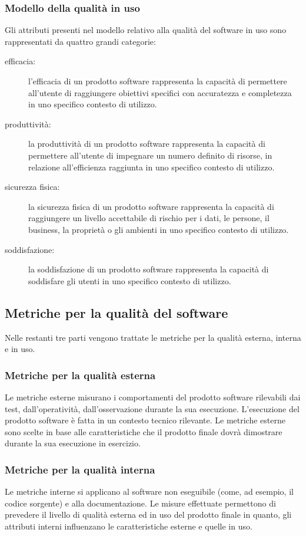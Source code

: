 \documentclass[../PianoDiQualifica.tex]{subfiles}
\begin{document}
\begin{appendices}
		\subsubsection{Modello della qualità in uso}
		Gli attributi presenti nel modello relativo alla qualità del software in uso sono rappresentati da quattro grandi categorie:
		\begin{description}
			\item[efficacia:] l'efficacia di un prodotto software rappresenta la capacità di permettere all'utente di raggiungere obiettivi specifici con accuratezza e completezza in uno specifico contesto di utilizzo.
			\item[produttività:] la produttività di un prodotto software rappresenta la capacità di permettere all'utente di impegnare un numero definito di risorse, in relazione all’efficienza raggiunta in uno specifico contesto di utilizzo.
			\item[sicurezza fisica:] la sicurezza fisica di un prodotto software rappresenta la capacità di raggiungere un livello accettabile di rischio per i dati, le persone, il business, la proprietà o gli ambienti in uno specifico contesto di utilizzo.
			\item[soddisfazione:] la soddisfazione di un prodotto software rappresenta la capacità di soddisfare gli utenti in uno specifico contesto di utilizzo.
		\end{description}
	
	\subsection{Metriche per la qualità del software}
	Nelle restanti tre parti vengono trattate le metriche per la qualità esterna, interna e in uso.
	
	\subsubsection{Metriche per la qualità esterna}
	Le metriche esterne misurano i comportamenti del prodotto software rilevabili dai test, dall'operatività, dall'osservazione durante la sua esecuzione. L'esecuzione del prodotto software è fatta in un contesto tecnico rilevante.
	Le metriche esterne sono scelte in base alle caratteristiche che il prodotto finale dovrà dimostrare durante la sua esecuzione in esercizio.
	
	\subsubsection{Metriche per la qualità interna}
	Le metriche interne si applicano al software non eseguibile (come, ad esempio, il codice sorgente) e alla documentazione. Le misure effettuate permettono di prevedere il livello di qualità esterna ed in uso del prodotto finale in quanto, gli attributi interni influenzano le caratteristiche esterne e quelle in uso.
	

\end{appendices}
\end{document}

